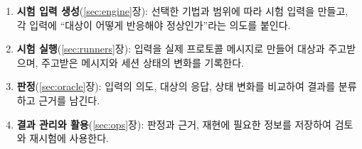 \begin{enumerate}
    \item \textbf{시험 입력 생성}(\ref{sec:engine}장): 선택한 기법과 범위에 따라 시험 입력을 만들고, 각 입력에 ``대상이 어떻게 반응해야 정상인가''라는 의도를 붙인다.
    \item \textbf{시험 실행}(\ref{sec:runners}장): 입력을 실제 프로토콜 메시지로 만들어 대상과 주고받으며, 주고받은 메시지와 세션 상태의 변화를 기록한다.
    \item \textbf{판정}(\ref{sec:oracle}장): 입력의 의도, 대상의 응답, 상태 변화를 비교하여 결과를 분류하고 근거를 남긴다.
    \item \textbf{결과 관리와 활용}(\ref{sec:ops}장): 판정과 근거, 재현에 필요한 정보를 저장하여 검토와 재시험에 사용한다.
\end{enumerate}
